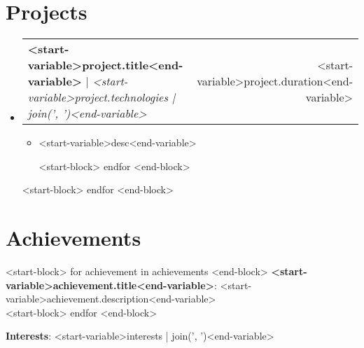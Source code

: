\documentclass[a4paper,12pt]{article}
\makeatletter
\newcommand{\resumeItem}[1]{
  \item\small{
    {#1 \vspace{-2pt}}
  }
}
\newcommand{\resumeProjectHeading}[2]{
    \item
    \begin{tabular*}{0.97\textwidth}{l@{\extracolsep{\fill}}r}
      \small#1 & #2 \\
    \end{tabular*}\vspace{-7pt}
}
\newcommand{\resumeSubHeadingListStart}{\begin{itemize}[leftmargin=0.15in, label={}]}
\newcommand{\resumeSubHeadingListEnd}{\end{itemize}}
\newcommand{\resumeItemListStart}{\begin{itemize}}
\newcommand{\resumeItemListEnd}{\end{itemize}\vspace{-5pt}}
\makeatother
\begin{document}
\section{Projects}
    \resumeSubHeadingListStart
<start-block> for project in projects <end-block>
      \resumeProjectHeading
          {\textbf{<start-variable>project.title<end-variable>} $|$ \emph{<start-variable>project.technologies | join(', ')<end-variable>}}{<start-variable>project.duration<end-variable>}
          \resumeItemListStart
<start-block> for desc in project.description <end-block>
            \resumeItem{<start-variable>desc<end-variable>}
<start-block> endfor <end-block>
          \resumeItemListEnd
<start-block> endfor <end-block>
    \resumeSubHeadingListEnd

\section{Achievements}
 \begin{itemize}[leftmargin=0.15in, label={}]
    \small{\item{
<start-block> for achievement in achievements <end-block>
     \textbf{<start-variable>achievement.title<end-variable>}{: <start-variable>achievement.description<end-variable>} \\
<start-block> endfor <end-block>
    }}
     \textbf{Interests}{: <start-variable>interests | join(', ')<end-variable>} \\
 \end{itemize}




\end{document}
